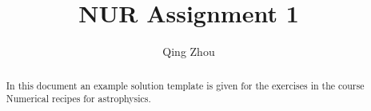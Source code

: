 \documentclass[a4paper,10pt]{article}
\title{NUR Assignment 1}
\author{Qing Zhou}
\begin{document}
\maketitle

\begin{abstract}
 In this document an example solution template is given for the exercises in the 
 course Numerical recipes for astrophysics.
\end{abstract}




\end{document}
